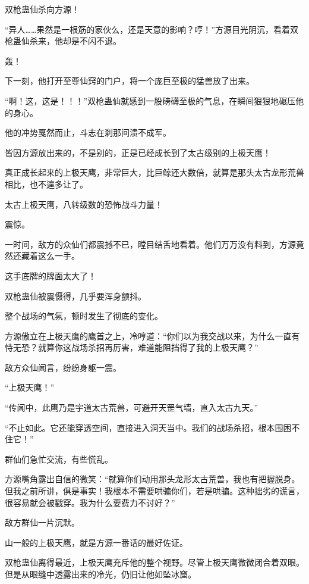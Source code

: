 
\begin{this_body}

双枪蛊仙杀向方源！

“异人……果然是一根筋的家伙么，还是天意的影响？哼！”方源目光阴沉，看着双枪蛊仙杀来，他却是不闪不退。

轰！

下一刻，他打开至尊仙窍的门户，将一个庞巨至极的猛兽放了出来。

“啊！这，这是！！！”双枪蛊仙就感到一股磅礴至极的气息，在瞬间狠狠地碾压他的身心。

他的冲势戛然而止，斗志在刹那间溃不成军。

皆因方源放出来的，不是别的，正是已经成长到了太古级别的上极天鹰！

真正成长起来的上极天鹰，非常巨大，比巨鲸还大数倍，就算是那头太古龙形荒兽相比，也不遑多让了。

太古上极天鹰，八转级数的恐怖战斗力量！

震惊。

一时间，敌方的众仙们都震撼不已，瞠目结舌地看着。他们万万没有料到，方源竟然还藏着这么一手。

这手底牌的牌面太大了！

双枪蛊仙被震慑得，几乎要浑身颤抖。

整个战场的气氛，顿时发生了彻底的变化。

方源傲立在上极天鹰的鹰首之上，冷哼道：“你们以为我交战以来，为什么一直有恃无恐？就算你这战场杀招再厉害，难道能阻挡得了我的上极天鹰？”

敌方众仙闻言，纷纷身躯一震。

“上极天鹰！”

“传闻中，此鹰乃是宇道太古荒兽，可避开天罡气墙，直入太古九天。”

“不止如此。它还能穿透空间，直接进入洞天当中。我们的战场杀招，根本围困不住它！”

群仙们急忙交流，有些慌乱。

方源嘴角露出自信的微笑：“就算你们动用那头龙形太古荒兽，我也有把握脱身。但我之前所讲，俱是事实！我根本不需要哄骗你们，若是哄骗。这种拙劣的谎言，很容易就会被戳穿。我为什么要费力不讨好？”

敌方群仙一片沉默。

山一般的上极天鹰，就是方源一番话的最好佐证。

双枪蛊仙离得最近，上极天鹰充斥他的整个视野。尽管上极天鹰微微闭合着双眼。但是从眼缝中透露出来的冷光，仍旧让他如坠冰窟。


\end{this_body}
